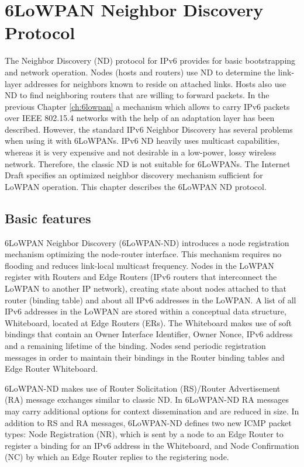 \chapter{6LoWPAN Neighbor Discovery Protocol}\label{ch:nd}
The Neighbor Discovery (ND) protocol for IPv6 \cite{rfc4861} provides for basic bootstrapping and network operation. Nodes (hosts and routers) use ND to determine the link-layer addresses for neighbors known to reside on attached links. Hosts also use ND to find neighboring routers that are willing to forward packets. In the previous Chapter \ref{ch:6lowpan} a mechanism which allows to carry IPv6 packets over IEEE 802.15.4 networks with the help of an adaptation layer has been described. However, the standard IPv6 Neighbor Discovery has several problems when using it with 6LoWPANs. IPv6 ND heavily uses multicast capabilities, whereas it is very expensive and not desirable in a low-power, lossy wireless network. Therefore, the classic ND is not suitable for 6LoWPANs. The Internet Draft \cite{draft-nd-07} specifies an optimized neighbor discovery mechanism sufficient for LoWPAN operation. This chapter describes the 6LoWPAN ND protocol.

\section{Basic features}\label{nd.basic}
6LoWPAN Neighbor Discovery (6LoWPAN-ND) introduces a node registration mechanism optimizing the node-router interface.  This mechanism requires no flooding and reduces link-local multicast frequency. Nodes in the LoWPAN register with Routers and Edge Routers (IPv6 routers that interconnect the LoWPAN to another IP network), creating state about nodes attached to that router (binding table) and about all IPv6 addresses in the LoWPAN. A list of all IPv6 addresses in the LoWPAN are stored within a conceptual data structure, Whiteboard, located at Edge Routers (ERs). The Whiteboard makes use of soft bindings that contain an Owner Interface Identifier, Owner Nonce, IPv6 address and a remaining lifetime of the binding. Nodes send periodic registration messages in order to maintain their bindings in the Router binding tables and Edge Router Whiteboard. 

6LoWPAN-ND makes use of Router Solicitation (RS)/Router Advertisement (RA) message exchanges similar to classic ND. In 6LoWPAN-ND RA messages may carry additional options for context dissemination and are reduced in size. In addition to RS and RA messages, 6LoWPAN-ND defines two new ICMP packet types: Node Registration (NR), which is sent by a node to an Edge Router to register a binding for an IPv6 address in the Whiteboard, and Node Confirmation (NC) by which an Edge Router replies to the registering node. 

